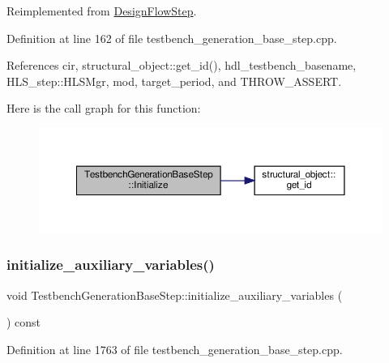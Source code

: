 Reimplemented from \hyperlink{classDesignFlowStep_a44b50683382a094976e1d432a7784799}{Design\+Flow\+Step}.



Definition at line 162 of file testbench\+\_\+generation\+\_\+base\+\_\+step.\+cpp.



References cir, structural\+\_\+object\+::get\+\_\+id(), hdl\+\_\+testbench\+\_\+basename, H\+L\+S\+\_\+step\+::\+H\+L\+S\+Mgr, mod, target\+\_\+period, and T\+H\+R\+O\+W\+\_\+\+A\+S\+S\+E\+RT.

Here is the call graph for this function\+:
\nopagebreak
\begin{figure}[H]
\begin{center}
\leavevmode
\includegraphics[width=350pt]{dc/d02/classTestbenchGenerationBaseStep_a3c3722de551d16d1d2b9c0fa22e73bcb_cgraph}
\end{center}
\end{figure}
\mbox{\label{classTestbenchGenerationBaseStep_a1055ee6f17948449e8ab78c798f4440c}} 
\subsubsection{\texorpdfstring{initialize\+\_\+auxiliary\+\_\+variables()}{initialize\_auxiliary\_variables()}}
{\footnotesize\ttfamily void Testbench\+Generation\+Base\+Step\+::initialize\+\_\+auxiliary\+\_\+variables (\begin{DoxyParamCaption}{ }\end{DoxyParamCaption}) const\hspace{0.3cm}{\ttfamily [protected]}}



Definition at line 1763 of file testbench\+\_\+generation\+\_\+base\+\_\+step.\+cpp.



